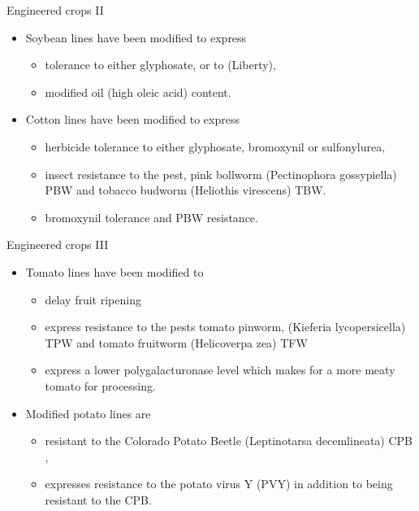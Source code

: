 \documentclass[ignorenonframetext,aspectratio=169]{beamer}
\providecommand{\tightlist}{%
  \setlength{\itemsep}{0pt}\setlength{\parskip}{0pt}}
\begin{document}
\begin{frame}{Engineered crops II}
\protect\hypertarget{engineered-crops-ii}{}

\begin{itemize}
\tightlist
\item
  Soybean lines have been modified to express

  \begin{itemize}
  \tightlist
  \item
    tolerance to either glyphosate, or to (Liberty),
  \item
    modified oil (high oleic acid) content.
  \end{itemize}
\item
  Cotton lines have been modified to express

  \begin{itemize}
  \tightlist
  \item
    herbicide tolerance to either glyphosate, bromoxynil or
    sulfonylurea,
  \item
    insect resistance to the pest, pink bollworm (Pectinophora
    gossypiella) PBW and tobacco budworm (Heliothis virescens) TBW.
  \item
    bromoxynil tolerance and PBW resistance.
  \end{itemize}
\end{itemize}

\end{frame}

\begin{frame}{Engineered crops III}
\protect\hypertarget{engineered-crops-iii}{}

\begin{itemize}
\tightlist
\item
  Tomato lines have been modified to

  \begin{itemize}
  \tightlist
  \item
    delay fruit ripening
  \item
    express resistance to the pests tomato pinworm, (Kieferia
    lycopersicella) TPW and tomato fruitworm (Helicoverpa zea) TFW
  \item
    express a lower polygalacturonase level which makes for a more meaty
    tomato for processing.
  \end{itemize}
\item
  Modified potato lines are

  \begin{itemize}
  \tightlist
  \item
    resistant to the Colorado Potato Beetle (Leptinotarsa decemlineata)
    CPB ,
  \item
    expresses resistance to the potato virus Y (PVY) in addition to
    being resistant to the CPB.
  \end{itemize}
\end{itemize}

\end{frame}
\end{document}
